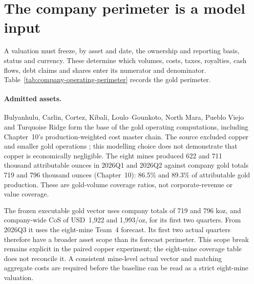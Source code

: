 \section{The company perimeter is a model input}
\label{sec:company-perimeter}

A valuation must freeze, by asset and date, the ownership and reporting basis,
status and currency. These determine which volumes, costs, taxes, royalties,
cash flows, debt claims and shares enter its numerator and denominator.
Table~\ref{tab:company-operating-perimeter} records the gold perimeter.

\paragraph{Admitted assets.}
Bulyanhulu, Carlin, Cortez, Kibali, Loulo--Gounkoto, North Mara, Pueblo Viejo
and Turquoise Ridge form the base of the gold operating computations,
including Chapter~10's production-weighted cost master chain. The source
excluded copper and smaller gold operations \cite{team4}; this modelling
choice does not demonstrate that copper is economically negligible.
The eight mines produced 622 and 711 thousand attributable ounces in 2026Q1
and 2026Q2 against company gold totals 719 and 796 thousand ounces
(Chapter~10): 86.5\% and 89.3\% of attributable gold production. These are
gold-volume coverage ratios, not corporate-revenue or value coverage.

The frozen executable gold vector uses company totals of 719 and 796 koz,
and company-wide CoS of USD~1,922 and 1,993/oz, for its first two quarters.
From 2026Q3 it uses the eight-mine Team~4 forecast. Its first two actual
quarters therefore have a broader asset scope than its forecast perimeter.
This scope break remains explicit in the paired copper experiment; the
eight-mine coverage table does not reconcile it. A consistent mine-level
actual vector and matching aggregate costs are required before the baseline
can be read as a strict eight-mine valuation.

